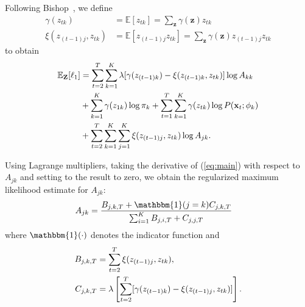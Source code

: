 Following Bishop~\cite{bishop2007pattern}, we define
\begin{align*}
    \gamma(z_{tk}) &= \mathbb{E}[z_{tk}] = \sum_{\mathbf{z}}\gamma(\mathbf{z})z_{tk} \\
    \xi(z_{(t-1)j}, z_{tk}) &= \mathbb{E}[z_{(t-1)j}z_{tk}] = \sum_{\mathbf{z}}\gamma(\mathbf{z})z_{(t-1)j}z_{tk}
\end{align*}
to obtain
\begin{align}\label{eq:main}
    \mathbb{E}_{\mathbf{Z}}[\ell_1]
    &= \sum^{T}_{t=2}\sum^{K}_{k=1}\lambda[\gamma(z_{(t-1)k})-\xi(z_{(t-1)k}, z_{tk})]\log A_{kk} \notag\\
    &+ \sum_{k=1}^{K}\gamma(z_{1k})\log \pi_{k} + \sum_{t=1}^{T}\sum_{k=1}^{K} \gamma(z_{tk})\log P(\mathbf{x}_t ; \mathbf{\phi}_k) \notag\\
    &+ \sum_{t=2}^{T}\sum_{k=1}^{K}\sum_{j=1}^{K}\xi(z_{(t-1)j}, z_{tk})\log A_{jk}.
\end{align}

Using Lagrange multipliers, taking the derivative of (\ref{eq:main}) with
respect to $A_{jk}$ and setting to the result to zero, we obtain the regularized
maximum likelihood estimate for $A_{jk}$:
\begin{align}\label{eq:PSO-final}
    A_{jk} &= \frac{B_{j,k,T} + {\mathbbm{1}(j = k)}C_{j,k,T}} 
                   {\sum_{i=1}^{K} B_{j,i,T} + C_{j,j,T}}
\end{align}
where $\mathbbm{1}(\cdot)$ denotes the indicator function and
\begin{align}\label{eq:PSO-final-C-part}
    B_{j,k,T} &= \sum_{t=2}^{T} \xi(z_{(t-1)j}, z_{tk}), \notag\\
    C_{j,k,T} &= \lambda\left[\sum_{t=2}^{T}[\gamma(z_{(t-1)k}) - \xi(z_{(t-1)j}, z_{tk})]\right].
\end{align}
